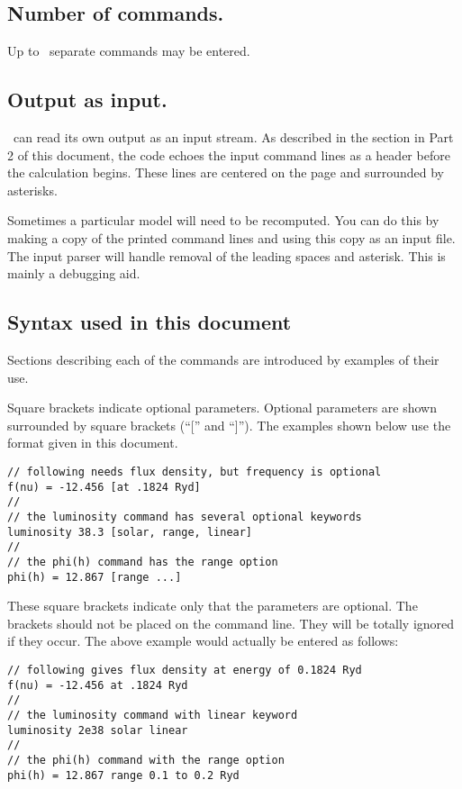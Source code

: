 \subsection{Number of commands.}
Up to \NKRD\ separate commands may be entered.

\subsection{Output as input.}  \Cloudy\ can read its own output
as an input stream.
As described in the section  in
Part 2 of this document, the code
echoes the input command lines as a header
before the calculation begins.
These lines are centered on the page and surrounded by asterisks.

Sometimes a particular model will need to be recomputed.  You can do
this by making a copy of the printed command lines and using this copy as
an input file.  The input parser will handle removal of the leading spaces
and asterisk.  This is mainly a debugging aid.

\subsection{Syntax used in this document}

Sections describing each of the commands are introduced
by examples of their use.

Square brackets indicate optional parameters.
Optional parameters are
shown surrounded by square brackets (``['' and ``]'').
The examples shown
below use the format given in this document.
\begin{verbatim}
// following needs flux density, but frequency is optional
f(nu) = -12.456 [at .1824 Ryd]
//
// the luminosity command has several optional keywords
luminosity 38.3 [solar, range, linear]
//
// the phi(h) command has the range option
phi(h) = 12.867 [range ...]
\end{verbatim}
These square brackets indicate only that the parameters are optional.
The brackets should not be placed on the command line.
They will be totally ignored if they occur.
The above example would actually be entered as follows:
\begin{verbatim}
// following gives flux density at energy of 0.1824 Ryd
f(nu) = -12.456 at .1824 Ryd
//
// the luminosity command with linear keyword
luminosity 2e38 solar linear
//
// the phi(h) command with the range option
phi(h) = 12.867 range 0.1 to 0.2 Ryd
\end{verbatim}

